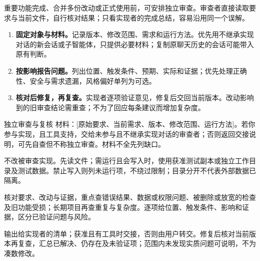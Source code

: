 重要功能完成、合并多份改动或正式使用前，可安排独立审查。审查者直接读取要求与当前文件，自行核对结果；只看实现者的完成总结，容易沿用同一个误解。
\begin{enumerate}
\item \textbf{固定对象与材料。}记录版本、修改范围、需求和运行方法。优先用不继承实现对话的新会话或子智能体，只提供必要材料；复制原聊天历史的会话可能带入原有判断。
\item \textbf{按影响报告问题。}列出位置、触发条件、预期、实际和证据；优先处理正确性、安全与需求遗漏，风格偏好单列为可选。
\item \textbf{核对后修复，再复查。}实现者逐项验证意见，修复后交回当前版本。改动影响到的旧审查结论需重查；不为了回应每条建议而增加复杂度。
\end{enumerate}
\begin{prompt}{独立审查与复核}
材料：[原始要求、当前需求、版本、修改范围、运行方法]。若你参与实现，且工具支持，交给未参与且不继承实现对话的审查者；否则返回交接说明，可先自查但不称独立审查。材料不全先列缺口。\par
不改被审查实现。先读文件；需运行且会写入时，使用获准测试副本或独立工作目录及测试数据。禁止写入则列未运行项，不绕过限制；目录分开不代表外部数据已隔离。\par
核对要求、改动与证据，重点查错误结果、数据或权限问题、被删除或放宽的检查及旧功能受损；长期项目再查重复与复杂度。逐项给位置、触发条件、影响和证据，区分已验证问题与风险。\par
输出给实现者的清单；获准且有工具时交接，否则由用户转交。修复后核对当前版本再复查，汇总已解决、仍存在及未验证项；范围内未发现实质问题可说明，不为凑数修改。
\end{prompt}
